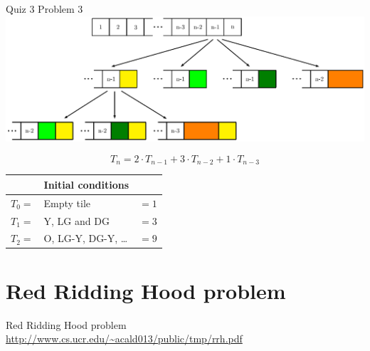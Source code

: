 \documentclass{beamer}
\begin{document}
\begin{frame}{Quiz 3 Problem 3}
    \centering
    \includegraphics[width=0.8\linewidth]{tiling2}

    $$ T_n = 2 \cdot T_{n-1} + 3 \cdot T_{n-2} + 1 \cdot T_{n-3}$$
    
    \begin{tabular}{l l l} \hline
                    & Initial conditions   &        \\ \hline
        $T_0 = $    & Empty tile           & $ = 1$ \\
        $T_1 = $    & Y, LG and DG         & $ = 3$ \\
        $T_2 = $    & O, LG-Y, DG-Y, \dots & $ = 9$ \\ \hline
    \end{tabular}
\end{frame}

\section{Red Ridding Hood problem}

\begin{frame}{Red Ridding Hood problem}
    \centering
    \url{http://www.cs.ucr.edu/~acald013/public/tmp/rrh.pdf}
\end{frame}
\end{document}
